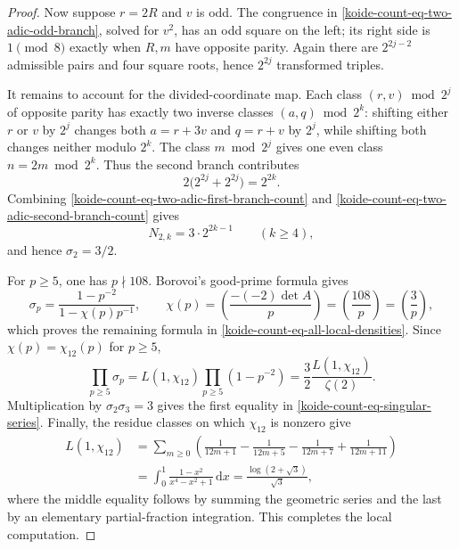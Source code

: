 \begin{proof}
Now suppose \(r=2R\) and \(v\) is odd.  The congruence in
\eqref{koide-count-eq-two-adic-odd-branch}, solved for \(v^2\), has an
odd square on the left; its right side is \(1\pmod8\) exactly when
\(R,m\) have opposite parity.  Again there are \(2^{2j-2}\) admissible
pairs and four square roots, hence \(2^{2j}\) transformed triples.

It remains to account for the divided-coordinate map.  Each class
\((r,v)\bmod2^j\) of opposite parity has exactly two inverse classes
\((a,q)\bmod2^k\): shifting either \(r\) or \(v\) by \(2^j\) changes both
\(a=r+3v\) and \(q=r+v\) by \(2^j\), while shifting both changes neither
modulo \(2^k\).  The class \(m\bmod2^j\) gives one even class
\(n=2m\bmod2^k\).  Thus the second branch contributes
\begin{equation}
 2\bigl(2^{2j}+2^{2j}\bigr)=2^{2k}.
 \label{koide-count-eq-two-adic-second-branch-count}
\end{equation}
Combining \eqref{koide-count-eq-two-adic-first-branch-count} and
\eqref{koide-count-eq-two-adic-second-branch-count} gives
\begin{equation}
 N_{2,k}=3\cdot2^{2k-1}\qquad(k\geq4),
 \label{koide-count-eq-two-adic-total-count}
\end{equation}
and hence \(\sigma_2=3/2\).

For \(p\geq5\), one has \(p\nmid108\).  Borovoi's good-prime formula
\cite[Section~1.3]{Borovoi_2001} gives
\[
 \sigma_p=\frac{1-p^{-2}}{1-\chi(p)p^{-1}},
 \qquad
 \chi(p)=\left(\frac{-(-2)\det A}{p}\right)
 =\left(\frac{108}{p}\right)=\left(\frac3p\right),
\]
which proves the remaining formula in
\eqref{koide-count-eq-all-local-densities}.  Since
\(\chi(p)=\chi_{12}(p)\) for \(p\geq5\),
\[
 \prod_{p\geq5}\sigma_p
 =L(1,\chi_{12})\prod_{p\geq5}(1-p^{-2})
 =\frac32\frac{L(1,\chi_{12})}{\zeta(2)}.
\]
Multiplication by \(\sigma_2\sigma_3=3\) gives the first equality in
\eqref{koide-count-eq-singular-series}.  Finally, the residue classes on
which \(\chi_{12}\) is nonzero give
\begin{align*}
 L(1,\chi_{12})
 &=\sum_{m\geq0}
 \left(
 \frac1{12m+1}-\frac1{12m+5}
 -\frac1{12m+7}+\frac1{12m+11}
 \right)\\
 &=\int_0^1\frac{1-x^2}{x^4-x^2+1}\,\mathrm dx
 =\frac{\log(2+\sqrt3)}{\sqrt3},
\end{align*}
where the middle equality follows by summing the geometric series and the
last by an elementary partial-fraction integration.  This completes the
local computation.
\end{proof}

